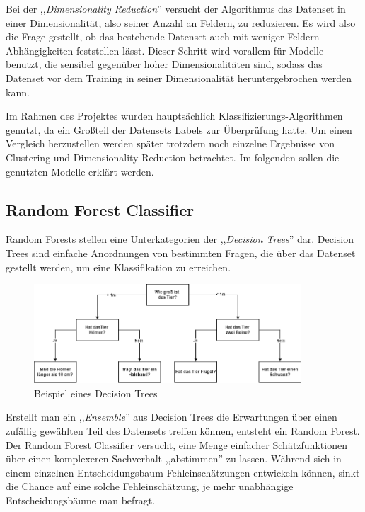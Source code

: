 Bei der ,,\textit{Dimensionality Reduction}'' versucht der Algorithmus das Datenset in einer 
Dimensionalität, also seiner Anzahl an Feldern, zu reduzieren. Es wird also die Frage gestellt, 
ob das bestehende Datenset auch mit weniger Feldern Abhängigkeiten feststellen lässt. Dieser 
Schritt wird vorallem für Modelle benutzt, die sensibel gegenüber hoher Dimensionalitäten sind, 
sodass das Datenset vor dem Training in seiner Dimensionalität heruntergebrochen werden kann.

Im Rahmen des Projektes wurden hauptsächlich Klassifizierungs-Algorithmen genutzt, da ein Großteil der 
Datensets Labels zur Überprüfung hatte. Um einen Vergleich herzustellen werden später trotzdem noch 
einzelne Ergebnisse von Clustering und Dimensionality Reduction betrachtet. Im folgenden sollen die genutzten 
Modelle erklärt werden.

\subsection{Random Forest Classifier}

Random Forests stellen eine Unterkategorien der ,,\textit{Decision Trees}'' dar. Decision Trees sind einfache
Anordnungen von bestimmten Fragen, die über das Datenset gestellt werden, um eine Klassifikation zu erreichen.

\begin{figure}[h]
    \centering
    \includegraphics[width=10.0cm]{pic/DecisionTree.png}
    \caption{Beispiel eines Decision Trees}
    \label{fig:DT_Beispiel}
\end{figure}

Erstellt man ein ,,\textit{Ensemble}'' aus Decision Trees die Erwartungen über einen zufällig gewählten 
Teil des Datensets treffen können, entsteht ein Random Forest.
Der Random Forest Classifier versucht, eine Menge einfacher Schätzfunktionen über einen komplexeren 
Sachverhalt ,,abstimmen'' zu lassen. Während sich in einem einzelnen Entscheidungsbaum Fehleinschätzungen 
entwickeln können, sinkt die Chance auf eine solche Fehleinschätzung, je mehr unabhängige 
Entscheidungsbäume man befragt. 

